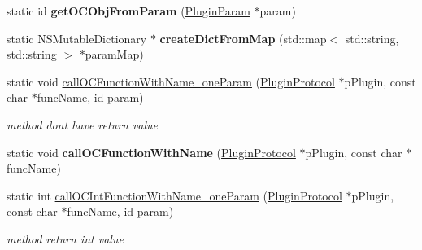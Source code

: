 \begin{DoxyCompactItemize}
\item 
\mbox{\label{classcocos2d_1_1plugin_1_1PluginUtilsIOS_a5dab6fc71664616e81b470eaad00888f}} 
static id {\bfseries get\+O\+C\+Obj\+From\+Param} (\hyperlink{classcocos2d_1_1plugin_1_1PluginParam}{Plugin\+Param} $\ast$param)
\item 
\mbox{\label{classcocos2d_1_1plugin_1_1PluginUtilsIOS_a6b9a3abf05a418033213d1b7d2721a15}} 
static N\+S\+Mutable\+Dictionary $\ast$ {\bfseries create\+Dict\+From\+Map} (std\+::map$<$ std\+::string, std\+::string $>$ $\ast$param\+Map)
\item 
\mbox{\label{classcocos2d_1_1plugin_1_1PluginUtilsIOS_a1f1d0d85a317a60cf467bb43a8125f57}} 
static void \hyperlink{classcocos2d_1_1plugin_1_1PluginUtilsIOS_a1f1d0d85a317a60cf467bb43a8125f57}{call\+O\+C\+Function\+With\+Name\+\_\+one\+Param} (\hyperlink{classcocos2d_1_1plugin_1_1PluginProtocol}{Plugin\+Protocol} $\ast$p\+Plugin, const char $\ast$func\+Name, id param)
\begin{DoxyCompactList}\small\item\em method don\textquotesingle{}t have return value \end{DoxyCompactList}\item 
\mbox{\label{classcocos2d_1_1plugin_1_1PluginUtilsIOS_ab695c20d2ec304a9fb866f8efd02d29d}} 
static void {\bfseries call\+O\+C\+Function\+With\+Name} (\hyperlink{classcocos2d_1_1plugin_1_1PluginProtocol}{Plugin\+Protocol} $\ast$p\+Plugin, const char $\ast$func\+Name)
\item 
\mbox{\label{classcocos2d_1_1plugin_1_1PluginUtilsIOS_acbd839736165265512d2aa967721d0ae}} 
static int \hyperlink{classcocos2d_1_1plugin_1_1PluginUtilsIOS_acbd839736165265512d2aa967721d0ae}{call\+O\+C\+Int\+Function\+With\+Name\+\_\+one\+Param} (\hyperlink{classcocos2d_1_1plugin_1_1PluginProtocol}{Plugin\+Protocol} $\ast$p\+Plugin, const char $\ast$func\+Name, id param)
\begin{DoxyCompactList}\small\item\em method return int value \end{DoxyCompactList}\item 

\end{DoxyCompactItemize}
